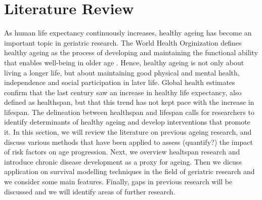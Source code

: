 \chapter{Literature Review}
\label{chap:lit_review} 

As human life expectancy continuously increases, healthy ageing has become an important topic in geriatric research. The World Health Orginization defines healthy ageing as the process of developing and maintaining the functional ability that enables well-being in older age \citep{WHO}. Hence, healthy ageing is not only about living a longer life, but about maintaining good physical and mental health, independence and social participation in later life. Global health estimates confirm that the last century saw an increase in healthy life expectancy, also defined as healthspan, but that this trend has not kept pace with the increase in lifespan. The delineation between healthspan and lifespan calls for researchers to identify determinants of healthy ageing and develop interventions that promote it. In this section, we will review the literature on previous ageing research, and discuss various methods that have been applied to assess (quantify?) the impact of risk factors on age progression. Next, we overview healtspan research and introduce chronic disease development as a proxy for ageing. Then we dicuss application on survival modelling techniques in the field of geriatric research and we consider some main features. Finally, gaps in previous research will be discussed and we will identify areas of further research. %



